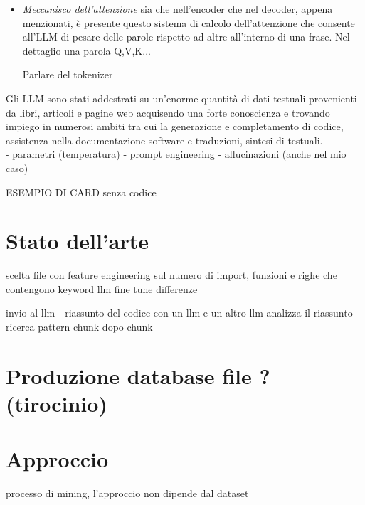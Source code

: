 \documentclass{article}
\begin{document}
\begin{itemize}
\begin{itemize}
    \item \textit{Meccanisco dell'attenzione} sia che nell'encoder che nel decoder, appena menzionati, è presente questo sistema di calcolo dell'attenzione che consente all'LLM di pesare delle parole rispetto ad altre all'interno di una frase. Nel dettaglio una parola Q,V,K...

Parlare del tokenizer
\end{itemize}
Gli LLM sono stati addestrati su un'enorme quantità di dati testuali provenienti da libri, articoli e pagine web acquisendo una forte conoscienza e trovando impiego in numerosi ambiti tra cui la generazione e completamento di codice, assistenza nella documentazione software e traduzioni, sintesi di testuali.\\
- parametri (temperatura)
- prompt engineering
- allucinazioni (anche nel mio caso)
\end{itemize}


ESEMPIO DI CARD senza codice

\section{Stato dell'arte}
scelta file con feature engineering sul numero di import, funzioni e righe che contengono keyword
llm fine tune 
differenze


invio al llm
- riassunto del codice con un llm e un altro llm analizza il riassunto
- ricerca pattern chunk dopo chunk

\section{Produzione database file ?(tirocinio)}

\section{Approccio}

processo di mining, l'approccio non dipende dal dataset
\end{document}
